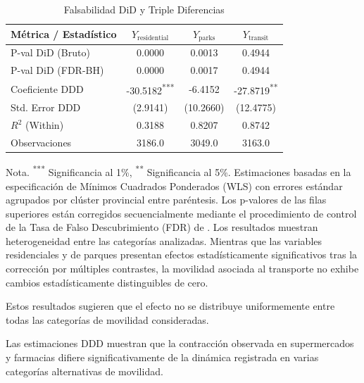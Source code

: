 \begin{table}[H]
    \centering
    \caption{Falsabilidad DiD y Triple Diferencias}
    \label{tab:robustez_unificada_inv}
    \small
    \begin{tabular}{lccc}
        \toprule
        M\'etrica / Estad\'istico & $Y_{\text{residential}}$ & $Y_{\text{parks}}$ & $Y_{\text{transit}}$ \\
        \midrule
        P-val DiD (Bruto)        & 0.0000                       & 0.0013                 & 0.4944 \\
        P-val DiD (FDR-BH)       & 0.0000                       & 0.0017                 & 0.4944 \\
        Coeficiente DDD          & -30.5182\textsuperscript{***} & -6.4152                & -27.8719\textsuperscript{**} \\
        Std. Error DDD           & (2.9141)                     & (10.2660)              & (12.4775) \\
        $R^2$ (Within)           & 0.3188                       & 0.8207                 & 0.8742 \\
        Observaciones            & 3186.0                       & 3049.0                 & 3163.0 \\
        \bottomrule
    \end{tabular}
    \vspace{0.15cm}
    \begin{flushleft}
    \small{Nota. \textsuperscript{***} Significancia al 1\%, \textsuperscript{**} Significancia al 5\%. Estimaciones basadas en la especificaci\'on de M\'inimos Cuadrados Ponderados (WLS) con errores est\'andar agrupados por cl\'uster provincial entre par\'entesis. Los p-valores de las filas superiores est\'an corregidos secuencialmente mediante el procedimiento de control de la Tasa de Falso Descubrimiento (FDR) de \citet{benjamini1995}. Los resultados muestran heterogeneidad entre las categor\'ias analizadas. Mientras que las variables residenciales y de parques presentan efectos estad\'isticamente significativos tras la correcci\'on por m\'ultiples contrastes, la movilidad asociada al transporte no exhibe cambios estad\'isticamente distinguibles de cero.}
    \end{flushleft}
\end{table}

Estos resultados sugieren que el efecto no se distribuye uniformemente entre todas las categor\'ias de movilidad consideradas.

Las estimaciones DDD muestran que la contracci\'on observada en supermercados y farmacias difiere significativamente de la din\'amica registrada en varias categor\'ias alternativas de movilidad.

